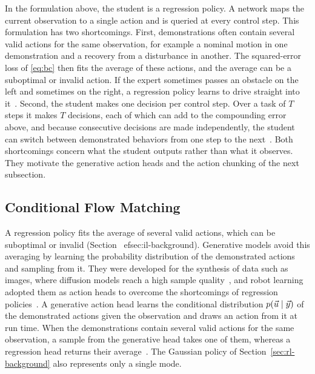 In the formulation above, the student is a regression policy. A network maps the current observation to a single action and is queried at every control step. This formulation has two shortcomings. First, demonstrations often contain several valid actions for the same observation, for example a nominal motion in one demonstration and a recovery from a disturbance in another. The squared-error loss of \eqref{eq:bc} then fits the average of these actions, and the average can be a suboptimal or invalid action. If the expert sometimes passes an obstacle on the left and sometimes on the right, a regression policy learns to drive straight into it~\cite{Chi2024}. Second, the student makes one decision per control step. Over a task of $T$ steps it makes $T$ decisions, each of which can add to the compounding error above, and because consecutive decisions are made independently, the student can switch between demonstrated behaviors from one step to the next~\cite{Zhao2023,Chi2024}. Both shortcomings concern what the student outputs rather than what it observes. They motivate the generative action heads and the action chunking of the next subsection.

\subsection{Conditional Flow Matching}\label{sec:generative-background}

A regression policy fits the average of several valid actions, which can be suboptimal or invalid (Section~
ef{sec:il-background}). Generative models avoid this averaging by learning the probability distribution of the demonstrated actions and sampling from it. They were developed for the synthesis of data such as images, where diffusion models reach a high sample quality~\cite{Ho2020,Rombach2022}, and robot learning adopted them as action heads to overcome the shortcomings of regression policies~\cite{Chi2024}. A generative action head learns the conditional distribution $p(\vec{u}\mid\vec{y})$ of the demonstrated actions given the observation and draws an action from it at run time. When the demonstrations contain several valid actions for the same observation, a sample from the generative head takes one of them, whereas a regression head returns their average~\cite{Chi2024}. The Gaussian policy of Section~\ref{sec:rl-background} also represents only a single mode.

